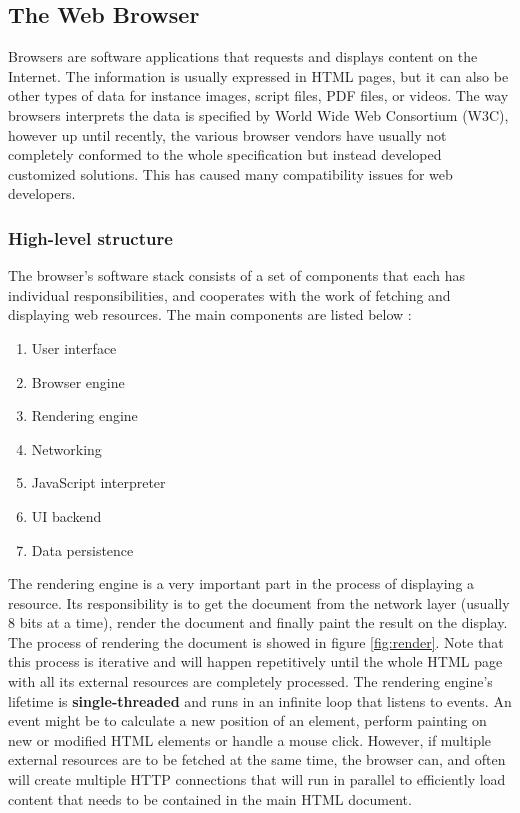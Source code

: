 \subsection{The Web Browser}
Browsers are software applications that requests and displays content on the Internet. The information is usually expressed in HTML pages, but it can also be other types of data for instance images, script files, PDF files, or videos. The way browsers interprets the data is specified by World Wide Web Consortium (W3C),\cite{w3c} however up until recently, the various browser vendors have usually not completely conformed to the whole specification but instead developed customized solutions. This has caused many compatibility issues for web developers.   

\subsubsection{High-level structure}
The browser's software stack consists of a set of components that each has individual responsibilities, and cooperates with the work of fetching and displaying web resources. The main components are listed below :
\begin {enumerate}
\item User interface
\item Browser engine
\item Rendering engine
\item Networking
\item JavaScript interpreter
\item UI backend
\item Data persistence
\end{enumerate} 

The rendering engine is a very important part in the process of displaying a resource. Its responsibility is to get the document from the network layer (usually 8 bits at a time), render the document and finally paint the result on the display. The process of rendering the document is showed in figure \vref{fig:render}. Note that this process is iterative and will happen repetitively until the whole HTML page with all its external resources are completely processed. The rendering engine's lifetime is \textbf{single-threaded} and runs in an infinite loop that listens to events. An event might be to calculate a new position of an element, perform painting on new or modified HTML elements or handle a mouse click. However, if multiple external resources are to be fetched at the same time, the browser can, and often will create multiple HTTP connections that will run in parallel to efficiently load content that needs to be contained in the main HTML document. 

